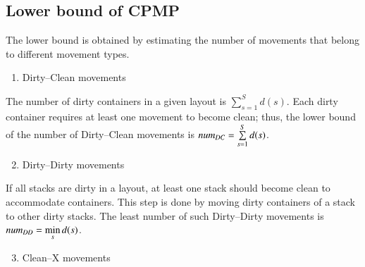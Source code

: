 \documentclass[review,3p,times,authoryear,12pt]{elsarticle}
\begin{document}
%
%


\subsection{Lower bound of CPMP}

The lower bound is obtained by estimating the number of movements that belong to different movement types.
\begin{enumerate}
\setcounter{enumi}{0}
\item Dirty--Clean movements
\end{enumerate}

The number of dirty containers in a given layout is $\sum\limits_{s=1}^S d(s)$. Each dirty container requires at least one movement to become clean; thus, the lower bound of the number of Dirty--Clean movements is $\id{num}_\id{DC}=\sum\limits_{s=1}^S d(s)$.

\begin{enumerate}
\setcounter{enumi}{1}
\item Dirty--Dirty movements
\end{enumerate}

If all stacks are dirty in a layout, at least one stack should become clean to accommodate containers. This step is done by moving dirty containers of a stack to other dirty stacks. The least number of such Dirty--Dirty movements is $\id{num}_\id{DD} = \min\limits_s d(s)$.

\begin{enumerate}
\setcounter{enumi}{2}
\item Clean--X movements
\end{enumerate}
\end{document}
